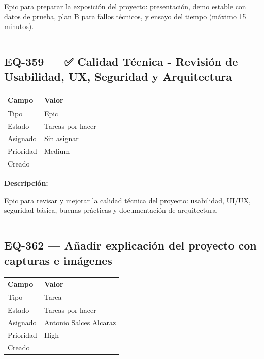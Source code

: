 \documentclass[
  spanish,
  11pt,
]{report}
\newcounter{none} %
\begin{document}
Epic para preparar la exposición del proyecto: presentación, demo
estable con datos de prueba, plan B para fallos técnicos, y ensayo del
tiempo (máximo 15 minutos).

\begin{center}\rule{0.5\linewidth}{0.5pt}\end{center}

\subsection{EQ-359 --- ✅ Calidad Técnica - Revisión de Usabilidad, UX,
Seguridad y
Arquitectura}\label{eq-359-calidad-tuxe9cnica---revisiuxf3n-de-usabilidad-ux-seguridad-y-arquitectura}

{\def\LTcaptype{none} %
\begin{longtable}[]{@{}ll@{}}
\toprule\noalign{}
Campo & Valor \\
\midrule\noalign{}
\endhead
\bottomrule\noalign{}
\endlastfoot
Tipo & Epic \\
Estado & Tareas por hacer \\
Asignado & Sin asignar \\
Prioridad & Medium \\
Creado & \\
\end{longtable}
}

\textbf{Descripción:}

Epic para revisar y mejorar la calidad técnica del proyecto: usabilidad,
UI/UX, seguridad básica, buenas prácticas y documentación de
arquitectura.

\begin{center}\rule{0.5\linewidth}{0.5pt}\end{center}

\subsection{EQ-362 --- Añadir explicación del proyecto con capturas e
imágenes}\label{eq-362-auxf1adir-explicaciuxf3n-del-proyecto-con-capturas-e-imuxe1genes}

{\def\LTcaptype{none} %
\begin{longtable}[]{@{}ll@{}}
\toprule\noalign{}
Campo & Valor \\
\midrule\noalign{}
\endhead
\bottomrule\noalign{}
\endlastfoot
Tipo & Tarea \\
Estado & Tareas por hacer \\
Asignado & Antonio Salces Alcaraz \\
Prioridad & High \\
Creado & \\
\end{longtable}
}
\end{document}
